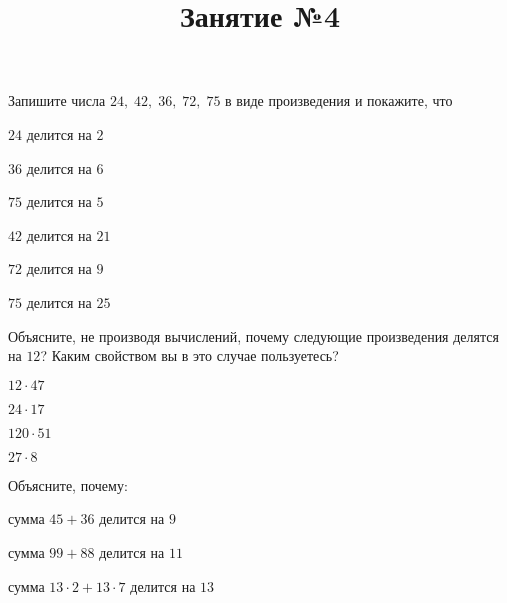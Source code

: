 \begin{listofex}
\begin{enumcols}[itemcolumns=1]
	\end{enumcols}
	\item Запишите числа \( 24,\;42,\;36,\;72,\;75 \) в виде произведения и покажите, что
	\begin{enumcols}[itemcolumns=3]
		\item \( 24 \) делится на \( 2 \)
		\item \( 36 \) делится на \( 6 \)
		\item \( 75 \) делится на \( 5 \)
		\item \( 42 \) делится на \( 21 \)
		\item \( 72 \) делится на \( 9 \)
		\item \( 75 \) делится на \( 25 \)
	\end{enumcols}
	\item Объясните, не производя вычислений, почему следующие произведения делятся на \( 12 \)? Каким свойством вы в это случае пользуетесь?
	\begin{enumcols}[itemcolumns=4]
		\item \( 12\cdot47 \)
		\item \( 24\cdot17 \)
		\item \( 120\cdot51 \)
		\item \( 27\cdot8 \)
	\end{enumcols}
	\item Объясните, почему:
	\begin{enumcols}[itemcolumns=2]
		\item сумма \( 45+36 \) делится на \( 9 \)
		\item сумма \( 99+88 \) делится на \( 11 \)
		\item сумма \( 13\cdot2+13\cdot7\) делится на \( 13 \)
	\end{enumcols}
\end{listofex}
\newpage
\title{Занятие №4}
